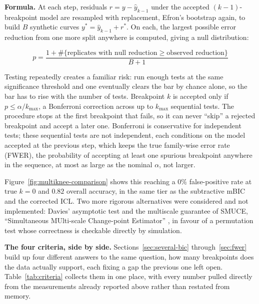 \documentclass[11pt]{article}
\begin{document}
\textbf{Formula.} At each step, residuals $r = y - \hat y_{k-1}$ under the
accepted $(k-1)$-breakpoint model are resampled with replacement, Efron's
bootstrap again, to build $B$ synthetic curves $y^\ast = \hat y_{k-1} +
r^\ast$. On each, the largest possible error reduction from one more split
anywhere is computed, giving a null distribution:

\begin{equation}
p = \frac{1 + \#\{\text{replicates with null reduction} \ge \text{observed reduction}\}}{B + 1}
\end{equation}

Testing repeatedly creates a familiar risk: run enough tests at the same
significance threshold and one eventually clears the bar by chance alone,
so the bar has to rise with the number of tests. Breakpoint $k$ is accepted
only if $p \le \alpha / k_{\max}$, a Bonferroni correction across up to
$k_{\max}$ sequential tests. The procedure stops at
the first breakpoint that fails, so it can never ``skip'' a rejected
breakpoint and accept a later one. Bonferroni is conservative for
independent tests; these sequential tests are not independent, each
conditions on the model accepted at the previous step, which keeps the
true family-wise error rate (FWER), the probability of accepting at
least one spurious breakpoint anywhere in the sequence, at most as large
as the nominal $\alpha$, not larger.

Figure~\ref{fig:multiknee-comparison} shows this reaching a $0\%$
false-positive rate at $\text{true } k = 0$ and $0.82$ overall accuracy,
in the same tier as the subtractive mBIC and the corrected ICL. Two
more rigorous alternatives were
considered and not implemented: Davies' asymptotic test
\citeyearpar{davies1977} and the multiscale guarantee of SMUCE,
``Simultaneous MUlti-scale Change-point Estimator'' \citep{frick2014}, in
favour of a permutation test whose correctness is checkable directly by
simulation.

\textbf{The four criteria, side by side.} Sections~\ref{sec:several-bic}
through~\ref{sec:fwer} build up four different answers to the same
question, how many breakpoints does the data actually support, each
fixing a gap the previous one left open. Table~\ref{tab:criteria}
collects them in one place, with every number pulled directly from the
measurements already reported above rather than restated from memory.
\end{document}
